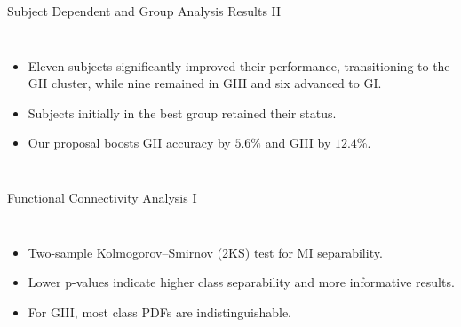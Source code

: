 \documentclass[aspectratio=169]{beamer}
\begin{document}
\begin{frame}{Subject Dependent and Group Analysis Results II}    
    \begin{columns}
        \begin{itemize}
            \item Eleven subjects significantly improved their performance, transitioning to the GII cluster, while nine remained in GIII and six advanced to GI.
            \item Subjects initially in the best group retained their status.
            \item Our proposal boosts GII accuracy by $5.6\%$ and GIII by $12.4\%$.
        \end{itemize}
            \centering
            \resizebox{1\linewidth}{!}{}

    \end{columns}
\end{frame}

\begin{frame}{Functional Connectivity Analysis I}
    \begin{columns}
            \begin{itemize}
                \item Two-sample Kolmogorov–Smirnov (2KS) test for MI separability.
                \item Lower p-values indicate higher class separability and more informative results.
                \item For GIII, most class PDFs are indistinguishable.
            \end{itemize}
            \centering
            \resizebox{0.8\linewidth}{!}{}
    \end{columns}
\end{frame}
\end{document}
